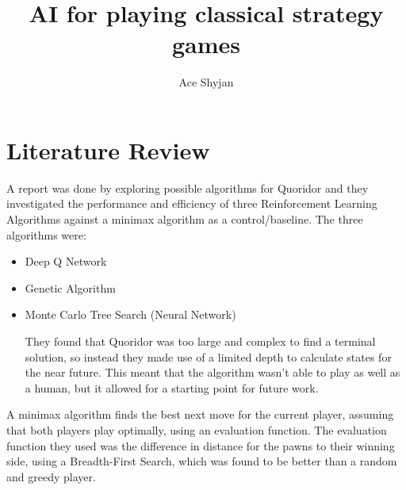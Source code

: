 \documentclass[review]{cmpreport}
\title{AI for playing classical strategy games}
\author{Ace Shyjan}
\begin{document}
\section{Literature Review}

A report was done by \cite{josequoridor} exploring possible algorithms for Quoridor and they investigated the performance and efficiency of three Reinforcement Learning Algorithms against a minimax algorithm as a control/baseline.
The three algorithms were:
\begin{itemize}
    \item Deep Q Network
    \item Genetic Algorithm
    \item Monte Carlo Tree Search (Neural Network)

They found that Quoridor was too large and complex to find a terminal solution, so instead they made use of a limited depth to calculate states for the near future. This meant that the algorithm wasn't able to play as well as a human, but it allowed for a starting point for future work.
\end{itemize}

A minimax algorithm finds the best next move for the current player, assuming that both players play optimally, using an evaluation function. The evaluation function they used was the difference in distance for the pawns to their winning side, using a Breadth-First Search, which was found to be better than a random and greedy player.


\end{document}
